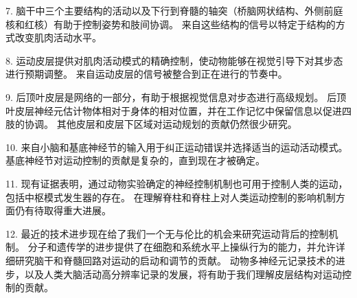 7. 脑干中三个主要结构的活动以及下行到脊髓的轴突（桥脑网状结构、外侧前庭核和红核）有助于控制姿势和肢间协调。
来自这些结构的信号以特定于结构的方式改变肌肉活动水平。


8. 运动皮层提供对肌肉活动模式的精确控制，使动物能够在视觉引导下对其步态进行预期调整。
来自运动皮层的信号被整合到正在进行的节奏中。


9. 后顶叶皮层是网络的一部分，有助于根据视觉信息对步态进行高级规划。
后顶叶皮层神经元估计物体相对于身体的相对位置，并在工作记忆中保留信息以促进四肢的协调。
其他皮层和皮层下区域对运动规划的贡献仍然很少研究。


10. 来自小脑和基底神经节的输入用于纠正运动错误并选择适当的运动活动模式。
基底神经节对运动控制的贡献是复杂的，直到现在才被确定。


11. 现有证据表明，通过动物实验确定的神经控制机制也可用于控制人类的运动，包括中枢模式发生器的存在。
在理解脊柱和脊柱上对人类运动控制的影响机制方面仍有待取得重大进展。


12. 最近的技术进步现在给了我们一个无与伦比的机会来研究运动背后的控制机制。
分子和遗传学的进步提供了在细胞和系统水平上操纵行为的能力，并允许详细研究脑干和脊髓回路对运动的启动和调节的贡献。
动物多神经元记录技术的进步，以及人类大脑活动高分辨率记录的发展，将有助于我们理解皮层结构对运动控制的贡献。

